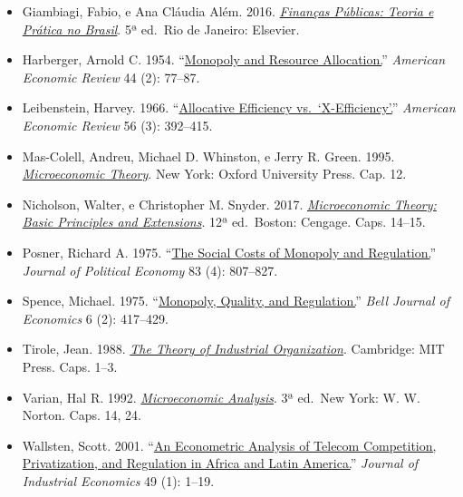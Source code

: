 \documentclass[11pt,twoside,openright]{book}
\begin{document}
\begin{itemize}
{  Economics} 135 (2): 561--644.
\item
  Giambiagi, Fabio, e Ana Cláudia Além. 2016.
  \href{https://books.google.com.br/books?id=Xqf-jwEACAAJ}{\emph{Finanças
  Públicas: Teoria e Prática no Brasil}}. 5ª ed.~Rio de Janeiro:
  Elsevier.
\item
  Harberger, Arnold C. 1954.
  ``\href{https://doi.org/10.2307/1923808}{Monopoly and Resource
  Allocation.}'' \emph{American Economic Review} 44 (2): 77--87.
\item
  Leibenstein, Harvey. 1966.
  ``\href{https://doi.org/10.2307/1823775}{Allocative Efficiency
  vs.~`X-Efficiency'.}'' \emph{American Economic Review} 56 (3):
  392--415.
\item
  Mas-Colell, Andreu, Michael D. Whinston, e Jerry R. Green. 1995.
  \href{https://books.google.com/books/about/Microeconomic_Theory.html?id=KGtegVXqD8wC}{\emph{Microeconomic
  Theory}}. New York: Oxford University Press. Cap. 12.
\item
  Nicholson, Walter, e Christopher M. Snyder. 2017.
  \href{https://books.google.com/books/about/Microeconomic_Theory_Basic_Principles_an.html?id=YdkhCwAAQBAJ}{\emph{Microeconomic
  Theory: Basic Principles and Extensions}}. 12ª ed.~Boston: Cengage.
  Caps. 14--15.
\item
  Posner, Richard A. 1975. ``\href{https://doi.org/10.1086/260357}{The
  Social Costs of Monopoly and Regulation.}'' \emph{Journal of Political
  Economy} 83 (4): 807--827.
\item
  Spence, Michael. 1975.
  ``\href{https://doi.org/10.2307/3003237}{Monopoly, Quality, and
  Regulation.}'' \emph{Bell Journal of Economics} 6 (2): 417--429.
\item
  Tirole, Jean. 1988.
  \href{https://books.google.com/books/about/The_Theory_of_Industrial_Organization.html?id=HIjsF0XONF8C}{\emph{The
  Theory of Industrial Organization}}. Cambridge: MIT Press. Caps. 1--3.
\item
  Varian, Hal R. 1992.
  \href{https://books.google.com/books/about/Microeconomic_Analysis.html?id=m20iQAAACAAJ}{\emph{Microeconomic
  Analysis}}. 3ª ed.~New York: W. W. Norton. Caps. 14, 24.
\item
  Wallsten, Scott. 2001.
  ``\href{https://doi.org/10.1111/1468-2354.t01-1-00106}{An Econometric
  Analysis of Telecom Competition, Privatization, and Regulation in
  Africa and Latin America.}'' \emph{Journal of Industrial Economics} 49
  (1): 1--19.
\end{itemize}

\newpage
\end{document}
